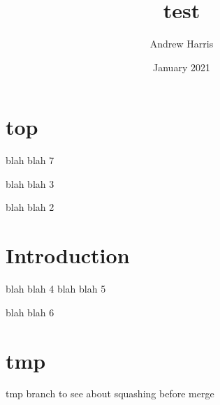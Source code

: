 \documentclass{article}
\title{test}
\author{Andrew Harris}
\date{January 2021}
\begin{document}
\maketitle
\section{top} 
blah blah 7

blah blah 3

blah blah 2


\section{Introduction}
blah blah 4
blah blah 5

blah blah 6

\section{tmp}

tmp branch to see about squashing before merge
\end{document}
